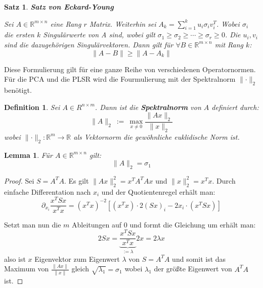\documentclass{article}
\newcommand{\R}[0]{\mathbb{R}}
\newtheorem{defin}{Definition}
\newtheorem{lemma}{Lemma}
\newtheorem{thm}{Satz}
\begin{document}
\begin{thm} \textbf{Satz von Eckard-Young}
    
    Sei $A \in \R^{m\times n}$ eine Rang $r$ Matrix. Weiterhin sei $A_k = \sum\limits_{i=1}^k u_i\sigma_iv_i^T$. 
    Wobei $\sigma_i$ die ersten $k$ Singulärwerte von A sind, wobei gilt $\sigma_1 \geq \sigma_2 \geq \cdots \geq \sigma_r \geq 0$. Die $u_i, v_i$ sind die dazugehörigen Singulärvektoren. 
    Dann gilt für $\forall B \in \R^{m \times n}$ mit Rang $k$:
    \begin{equation}
        \lVert A - B \rVert \geq \lVert A - A_k \rVert
    \end{equation}
\end{thm}

Diese Formulierung gilt für eine ganze Reihe von verschiedenen Operatornormen.
Für die PCA und die PLSR wird die Fourmulierung mit der Spektralnorm $\lVert \cdot \rVert_2$ benötigt.

\begin{defin}
    Sei $A \in R^{n \times m}$. Dann ist die \textbf{Spektralnorm} von $A$ definiert durch:
    \begin{equation}
        \lVert A \rVert_2 \: := \: \max\limits_{x \neq 0} \frac{\lVert Ax \rVert_2}{\lVert x \rVert_2}
    \end{equation}
    wobei $\lVert \cdot \rVert_2: \R^m \to \R$ als Vektornorm die gewöhnliche euklidische Norm ist.
\end{defin}

\begin{lemma}
    Für $A \in \R^{m \times n}$ gilt:
    \begin{equation}
        \lVert A \rVert_2 = \sigma_1
    \end{equation}
\end{lemma}

\begin{proof}
    Sei $S = A^TA$. Es gilt $\lVert Ax \rVert_2^2 = x^TA^TAx$ und $\lVert x \rVert_2^2 = x^Tx$.
    Durch einfache Differentation nach $x_i$ und der Quotientenregel erhält man:
    \begin{equation}
        \partial_{x_i}\frac{x^TSx}{x^Tx} = (x^Tx)^{-2}\left[ (x^Tx) \cdot 2(Sx)_i - 2x_i \cdot (x^TSx) \right]
    \end{equation}

    Setzt man nun die $m$ Ableitungen auf $0$ und formt die Gleichung um erhält man:
    \begin{equation}
        2Sx = \underbrace{\frac{x^TSx}{x^Tx}}_{:= \lambda} 2x = 2\lambda x
    \end{equation}
    also ist $x$ Eigenvektor zum Eigenwert $\lambda$ von $S = A^TA$ und
    somit ist das Maximum von $\frac{\lVert Ax \rVert}{\lVert x \rVert}$ gleich $\sqrt{\lambda_1} = \sigma_1$ wobei $\lambda_1$ der größte Eigenwert von $A^TA$ ist.
\end{proof}
\end{document}
